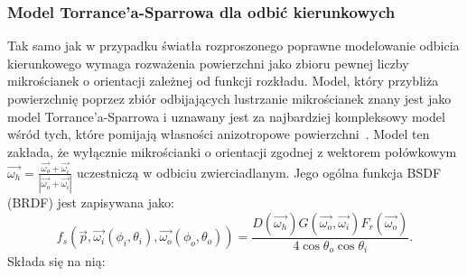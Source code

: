 \subsubsection{Model Torrance'a-Sparrowa dla odbić kierunkowych}
Tak samo jak w przypadku światła rozproszonego poprawne modelowanie odbicia kierunkowego wymaga rozważenia powierzchni jako zbioru pewnej liczby mikrościanek o orientacji zależnej od funkcji rozkładu. Model, który przybliża powierzchnię poprzez zbiór odbijających lustrzanie mikrościanek znany jest jako model Torrance'a-Sparrowa i uznawany jest za najbardziej kompleksowy model wśród tych, które pomijają własności anizotropowe powierzchni~\cite{Meister98investigationon}\cite{PBRT}. Model ten zakłada, że wyłącznie mikrościanki o orientacji zgodnej z wektorem połówkowym $\vec{\omega_h} = \frac{\vec{\omega_o} + \vec{\omega_i}}{|\vec{\omega_o} + \vec{\omega_i}|}$ uczestniczą w odbiciu zwierciadlanym.
Jego ogólna funkcja BSDF (BRDF) jest zapisywana jako:
\begin{equation}
f_s(\vec{p}, \vec{\omega_i}(\phi_i, \theta_i), \vec{\omega_o}(\phi_o, \theta_o)) = \frac{D(\vec{\omega_h})G(\vec{\omega_o}, \vec{\omega_i})F_r(\vec{\omega_o})}{4\cos\theta_o\cos\theta_i}.
\label{ch1:eq:TorranceSparrowFull}
\end{equation}
Składa się na nią:
